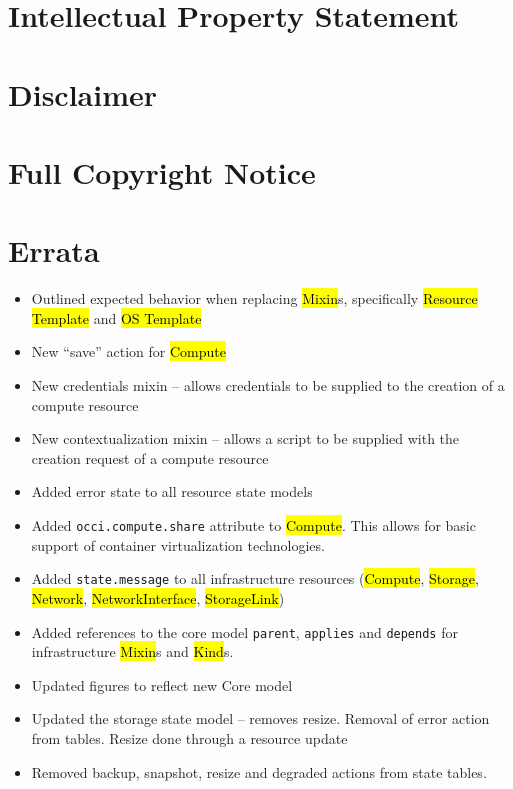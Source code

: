 \documentclass[10pt,a4paper]{article}
\begin{document}
\section{Intellectual Property Statement}


\section{Disclaimer}


\section{Full Copyright Notice}





\appendix

\newpage
\section{Errata}
\label{sec:errata}

\begin{itemize}
\item Outlined expected behavior when replacing \hl{Mixin}s, specifically \hl{Resource Template}
      and \hl{OS Template}
\item New ``save'' action for \hl{Compute}
\item New credentials mixin -- allows credentials to be supplied to the creation of a compute resource
\item New contextualization mixin -- allows a script to be supplied with the creation request of a compute resource
\item Added error state to all resource state models
\item Added \texttt{occi.compute.share} attribute to \hl{Compute}. This allows for basic support of container virtualization technologies.
\item Added \texttt{state.message} to all infrastructure resources (\hl{Compute}, \hl{Storage}, \hl{Network}, \hl{NetworkInterface}, \hl{StorageLink})
\item Added references to the core model \texttt{parent}, \texttt{applies} and \texttt{depends} for infrastructure \hl{Mixin}s and \hl{Kind}s.
\item Updated figures to reflect new Core model
\item Updated the storage state model -- removes resize. Removal of error action from tables. Resize done through a resource update
\item Removed backup, snapshot, resize and degraded actions from state tables.
\end{itemize}
\end{document}
